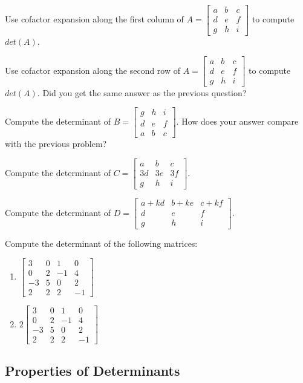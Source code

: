 \question Use cofactor expansion along the first column of \break $A=\begin{bmatrix} a&b&c\\d&e&f\\g&h&i \end{bmatrix}$ to compute $det(A)$.

\question Use cofactor expansion along the second row of \break $A=\begin{bmatrix} a&b&c\\d&e&f\\g&h&i \end{bmatrix}$ to compute $det(A)$. Did you get the same answer as the previous question?

\question Compute the determinant of $B=\begin{bmatrix}g&h&i \\d&e&f\\ a&b&c \end{bmatrix}$. How does your answer compare with the previous problem?

\question Compute the determinant of $C=\begin{bmatrix} a&b&c\\3d&3e&3f\\g&h&i \end{bmatrix}$.

\question Compute the determinant of $D=\begin{bmatrix} a+kd&b+ke&c+kf\\d&e&f\\g&h&i \end{bmatrix}$.

\bq Compute the determinant of the following matrices:
\begin{enumerate}
\item $\begin{bmatrix} 3&0&1&0\\0&2&-1&4 \\-3&5&0&2\\2&2&2&-1 \end{bmatrix}$
\item $2\begin{bmatrix} 3&0&1&0\\0&2&-1&4 \\-3&5&0&2\\2&2&2&-1 \end{bmatrix}$
\end{enumerate}
\eq
\subsection{Properties of Determinants}

